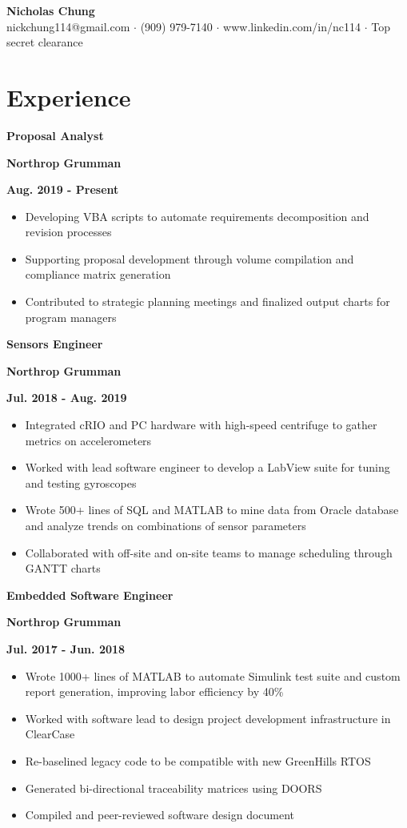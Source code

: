 \documentclass[12pt]{article}
\newcommand\textbox[1]{\parbox{.333\textwidth}{#1}}
\newcommand{\textlcr}[3]{\textbox{\textbf{#1}\hfill}\textbox{\hfil \textbf{#2}\hfil}\textbox{\hfill \textbf{#3}}}
\begin{document}
\begin{center}
	\textbf{\LARGE Nicholas Chung} \\ \vspace{.5ex}
	nickchung114@gmail.com $\cdot$ (909) 979-7140 $\cdot$ www.linkedin.com/in/nc114 $\cdot$ Top secret clearance
\end{center}

\vspace{-8pt}
\smallskip

\section*{Experience}
\vspace*{-1em}\makebox[\linewidth]{\rule{\textwidth}{0.4pt}}

\textlcr{Proposal Analyst}{Northrop Grumman}{Aug. 2019 - Present}
\begin{itemize}
\item Developing VBA scripts to automate requirements decomposition and revision processes
\item Supporting proposal development through volume compilation and compliance matrix generation
\item Contributed to strategic planning meetings and finalized output charts for program managers
\end{itemize}

\textlcr{Sensors Engineer}{Northrop Grumman}{Jul. 2018 - Aug. 2019}
\begin{itemize}
\item Integrated cRIO and PC hardware with high-speed centrifuge to gather metrics on accelerometers
\item Worked with lead software engineer to develop a LabView suite for tuning and testing gyroscopes
\item Wrote 500+ lines of SQL and MATLAB to mine data from Oracle database and analyze trends on combinations of sensor parameters
\item Collaborated with off-site and on-site teams to manage scheduling through GANTT charts
\end{itemize}

\bigskip
\textlcr{Embedded Software Engineer}{Northrop Grumman}{Jul. 2017 - Jun. 2018}
\begin{itemize}
\item Wrote 1000+ lines of MATLAB to automate Simulink test suite and custom report generation, improving labor efficiency by 40\%
\item Worked with software lead to design project development infrastructure in ClearCase
\item Re-baselined legacy code to be compatible with new GreenHills RTOS
\item Generated bi-directional traceability matrices using DOORS
\item Compiled and peer-reviewed software design document
\end{itemize}
\end{document}

